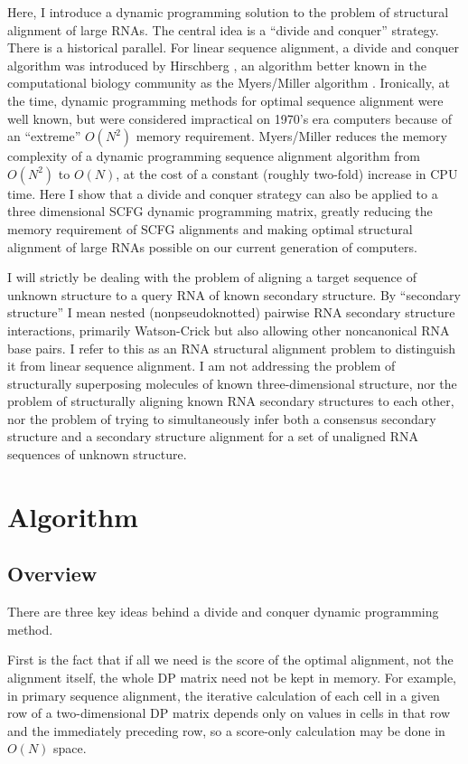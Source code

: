 \documentclass[11pt]{article}
\begin{document}
Here, I introduce a dynamic programming solution to the problem of
structural alignment of large RNAs. The central idea is a ``divide and
conquer'' strategy. There is a historical parallel.  For linear
sequence alignment, a divide and conquer algorithm was introduced by
Hirschberg \cite{Hirschberg75}, an algorithm better known in the
computational biology community as the Myers/Miller algorithm
\cite{MyM-88a}.  Ironically, at the time, dynamic programming methods
for optimal sequence alignment were well known, but were considered
impractical on 1970's era computers because of an ``extreme'' $O(N^2)$
memory requirement. Myers/Miller reduces the memory complexity of a
dynamic programming sequence alignment algorithm from $O(N^2)$ to
$O(N)$, at the cost of a constant (roughly two-fold) increase in CPU
time. Here I show that a divide and conquer strategy can also be
applied to a three dimensional SCFG dynamic programming matrix,
greatly reducing the memory requirement of SCFG alignments and making
optimal structural alignment of large RNAs possible on our current
generation of computers.

I will strictly be dealing with the problem of aligning a target
sequence of unknown structure to a query RNA of known secondary
structure. By ``secondary structure'' I mean nested (nonpseudoknotted)
pairwise RNA secondary structure interactions, primarily Watson-Crick
but also allowing other noncanonical RNA base pairs. I refer to this
as an RNA structural alignment problem to distinguish it from linear
sequence alignment. I am not addressing the problem of structurally
superposing molecules of known three-dimensional structure, nor the
problem of structurally aligning known RNA secondary structures to
each other, nor the problem of trying to simultaneously infer both a
consensus secondary structure and a secondary structure alignment for
a set of unaligned RNA sequences of unknown structure.

\section{Algorithm}

\subsection{Overview}

There are three key ideas behind a divide and conquer dynamic
programming method.

First is the fact that if all we need is the score of the optimal
alignment, not the alignment itself, the whole DP matrix need not be
kept in memory. For example, in primary sequence alignment, the
iterative calculation of each cell in a given row of a two-dimensional
DP matrix depends only on values in cells in that row and the
immediately preceding row, so a score-only calculation may be done in
$O(N)$ space.
\end{document}
